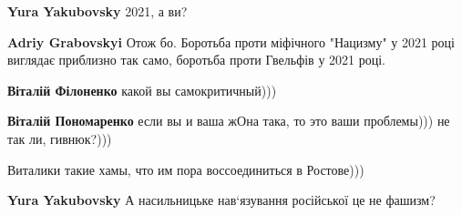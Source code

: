 \begin{itemize}
\begin{itemize}
 
\textbf{Yura Yakubovsky} 2021, а ви?

 
\textbf{Adriy Grabovskyi} Отож бо. Боротьба проти міфічного "Нацизму" у 2021 році виглядає приблизно так само, боротьба проти Гвельфів у 2021 році.

 
\textbf{Віталій Філоненко} какой вы самокритичный)))

 
\textbf{Віталій Пономаренко} если вы и ваша жОна така, то это ваши проблемы))) не так ли, гивнюк?)))

 
Виталики такие хамы, что им пора воссоединиться в Ростове)))

 
\textbf{Yura Yakubovsky} А насильницьке нав‘язування російської це не фашизм?

 

\end{itemize}
\end{itemize}
